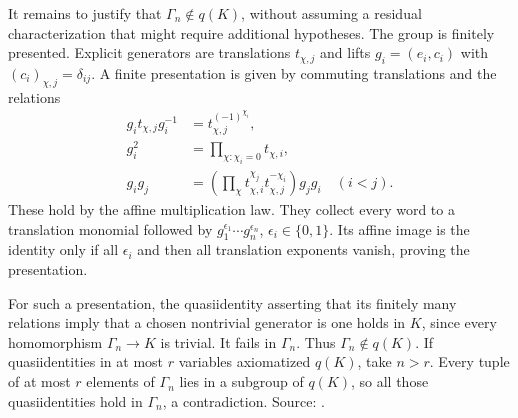 It remains to justify that \(\Gamma_n\notin q(K)\), without
assuming a residual characterization that might require
additional hypotheses. The group is finitely presented.
Explicit generators are translations \(t_{\chi,j}\) and
lifts \(g_i=(e_i,c_i)\) with
\((c_i)_{\chi,j}=\delta_{ij}\). A finite presentation is
given by commuting translations and the relations
\[
 \begin{split}
 g_it_{\chi,j}g_i^{-1}&=t_{\chi,j}^{(-1)^{\chi_i}},\\
 g_i^2&=\prod_{\chi:\chi_i=0}t_{\chi,i},\\
 g_ig_j&=\left(\prod_\chi
          t_{\chi,i}^{\chi_j}t_{\chi,j}^{-\chi_i}\right)g_jg_i
          \quad(i<j).
 \end{split}
\]
These hold by the affine multiplication law. They collect
every word to a translation monomial followed by
\(g_1^{\epsilon_1}\cdots g_n^{\epsilon_n}\),
\(\epsilon_i\in\{0,1\}\). Its affine image is the identity
only if all \(\epsilon_i\) and then all translation
exponents vanish, proving the presentation.

For such a presentation, the quasiidentity asserting that
its finitely many relations imply that a chosen nontrivial
generator is one holds in \(K\), since every homomorphism
\(\Gamma_n\to K\) is trivial. It fails in \(\Gamma_n\).
Thus \(\Gamma_n\notin q(K)\). If quasiidentities in at most
\(r\) variables axiomatized \(q(K)\), take \(n>r\).
Every tuple of at most \(r\) elements of \(\Gamma_n\)
lies in a subgroup of \(q(K)\), so all those
quasiidentities hold in \(\Gamma_n\), a contradiction.
Source: .

